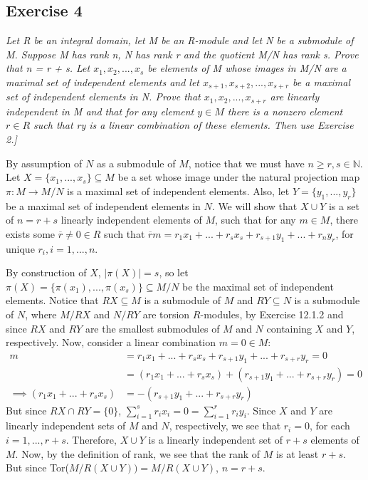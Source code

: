 \subsection*{Exercise 4}
\begin{framed}
\textit{Let R be an integral domain, let M be an R-module and let N be a submodule of M. Suppose M has rank n, N has rank r and the quotient M/N has rank s. Prove that n = r + s. Let $x_1, x_2, ..., x_s$ be elements of M whose images in M/N are a maximal set of independent elements and let $x_{s+1}, x_{s+2}, ..., x_{s+r}$ be a maximal set of independent elements in N. Prove that $x_1, x_2, ..., x_{s+r}$ are linearly independent in M and that for any element $y \in M$ there is a nonzero element $r \in R$ such that ry is a linear combination of these elements. Then use Exercise 2.]}
\end{framed}

By assumption of $N$ as a submodule of $M$, notice that we must have $n \ge r,s \in \mathbb{N}$. Let $X = \{x_1,...,x_s\} \subseteq M$ be a set whose image under the natural projection map $\pi: M \rightarrow M/N$ is a maximal set of independent elements. Also, let $Y = \{y_1,...,y_r\}$ be a maximal set of independent elements in $N$. We will show that $X \cup Y$ is a set of $n = r + s$ linearly independent elements of $M$, such that for any $m \in M$, there exists some $\overline{r} \not= 0 \in R$ such that $\overline{r}m = r_1x_1 + ... + r_sx_s + r_{s+1}y_1 + ... + r_ny_r$, for unique $r_i, i = 1,...,n$.

By construction of $X$, $|\pi(X)| = s$, so let $\pi(X) = \{\pi(x_1),...,\pi(x_s)\} \subseteq M/N$ be the maximal set of independent elements. Notice that $RX \subseteq M$ is a submodule of $M$ and $RY \subseteq N$ is a submodule of $N$, where $M/RX$ and $N/RY$ are torsion $R$-modules, by Exercise 12.1.2 and since $RX$ and $RY$ are the smallest submodules of $M$ and $N$ containing $X$ and $Y$, respectively. Now, consider a linear combination $m = 0 \in M$:
\begin{align*}
    m &= r_1x_1 + ... + r_sx_s + r_{s+1}y_1 + ... + r_{s+r}y_r = 0 \\
    &= (r_1x_1 + ... + r_sx_s) + (r_{s+1}y_1 + ... + r_{s+r}y_r) = 0 \\
    \implies (r_1x_1 + ... + r_sx_s) &= -(r_{s+1}y_1 + ... + r_{s+r}y_r)
\end{align*}
But since $RX \cap RY = \{0\}$, $\sum_{i=1}^sr_ix_i = 0 = \sum_{i=1}^rr_iy_i$. Since $X$ and $Y$ are linearly independent sets of $M$ and $N$, respectively, we see that $r_i = 0$, for each $i = 1,...,r+s$. Therefore, $X \cup Y$ is a linearly independent set of $r + s$ elements of $M$. Now, by the definition of rank, we see that the rank of $M$ is at least $r + s$. But since Tor($M/R(X \cup Y)) = M/R(X \cup Y)$, $n = r + s$.